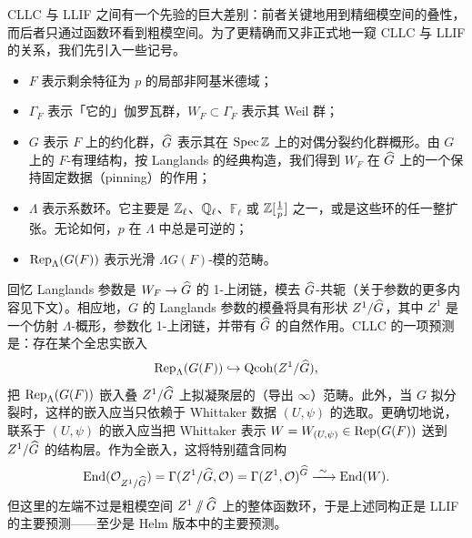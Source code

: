 CLLC 与 LLIF 之间有一个先验的巨大差别：前者关键地用到精细模空间的叠性，而后者只通过函数环看到粗模空间。为了更精确而又非正式地一窥 CLLC 与 LLIF 的关系，我们先引入一些记号。

\begin{itemize}[leftmargin=1.6em,itemsep=0.2em]
\item $F$ 表示剩余特征为 $p$ 的局部非阿基米德域；
\item $\Gamma_F$ 表示「它的」伽罗瓦群，$W_F \subset \Gamma_F$ 表示其 Weil 群；
\item $G$ 表示 $F$ 上的约化群，$\widehat{G}$ 表示其在 $\operatorname{Spec} \mathbb{Z}$ 上的对偶分裂约化群概形。由 $G$ 上的 $F$-有理结构，按 Langlands 的经典构造，我们得到 $W_F$ 在 $\widehat{G}$ 上的一个保持固定数据（pinning）的作用；
\item $\Lambda$ 表示系数环。它主要是 $\mathbb{Z}_\ell$、$\mathbb{Q}_\ell$、$\mathbb F_\ell$ 或 $\mathbb{Z}[\frac1p]$ 之一，或是这些环的任一整扩张。无论如何，$p$ 在 $\Lambda$ 中总是可逆的；
\item $\operatorname{Rep}_\Lambda(G(F))$ 表示光滑 $\Lambda G(F)$-模的范畴。
\end{itemize}

回忆 Langlands 参数是 $W_F \to \widehat{G}$ 的 1-上闭链，模去 $\widehat{G}$-共轭（关于参数的更多内容见下文）。相应地，$G$ 的 Langlands 参数的模叠将具有形状 $Z^1/\widehat{G}$，其中 $Z^1$ 是一个仿射 $\Lambda$-概形，参数化 1-上闭链，并带有 $\widehat{G}$ 的自然作用。CLLC 的一项预测是：存在某个全忠实嵌入
\[
\operatorname{Rep}_\Lambda(G(F)) \hookrightarrow \operatorname{Qcoh}(Z^1/\widehat{G}),
\]
把 $\operatorname{Rep}_\Lambda(G(F))$ 嵌入叠 $Z^1/\widehat{G}$ 上拟凝聚层的（导出 $\infty$）范畴。此外，当 $G$ 拟分裂时，这样的嵌入应当只依赖于 Whittaker 数据 $(U,\psi)$ 的选取。更确切地说，联系于 $(U,\psi)$ 的嵌入应当把 Whittaker 表示 $W = W_{(U,\psi)} \in \operatorname{Rep}(G(F))$ 送到 $Z^1/\widehat{G}$ 的结构层。作为全嵌入，这将特别蕴含同构
\[
\operatorname{End}(\mathcal O_{Z^1/\widehat{G}}) = \Gamma(Z^1/\widehat{G}, \mathcal O) = \Gamma(Z^1, \mathcal O)^{\widehat{G}} \xrightarrow{\ \sim\ } \operatorname{End}(W).
\]
但这里的左端不过是粗模空间 $Z^1 \sslash \widehat{G}$ 上的整体函数环，于是上述同构正是 LLIF 的主要预测——至少是 Helm 版本中的主要预测。
